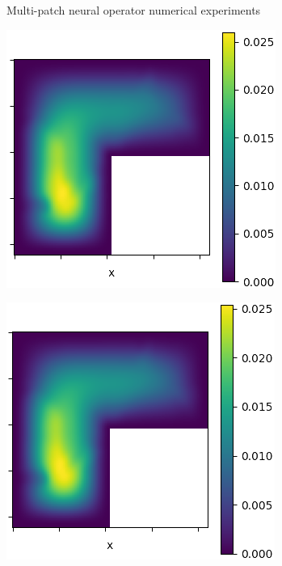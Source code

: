 \documentclass{beamer}
\begin{document}
\begin{frame}{Multi-patch neural operator numerical experiments}
\begin{center}
\begin{minipage}{0.24\textwidth}
            \includegraphics[width=\textwidth]{MPNO_output.png}
        \end{minipage}
        \hfill
        \begin{minipage}{0.24\textwidth}
            \includegraphics[width=\textwidth]{MPNO_appro.png}

\end{minipage}
\end{center}
\end{frame}
\end{document}
